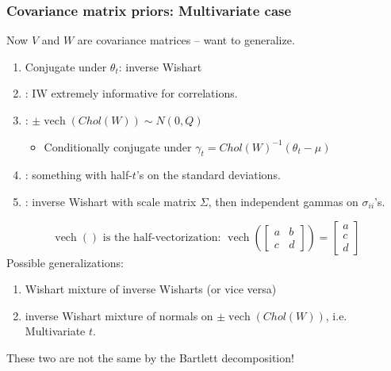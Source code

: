 \documentclass[xcolor=dvipsnames]{beamer}
\DeclareMathOperator{\vech}{vech}
\begin{document}
\begin{frame}
\frametitle{Covariance matrix priors: Multivariate case}
Now $V$ and $W$ are covariance matrices -- want to generalize.
\pause \begin{enumerate}
\item Conjugate under $\theta_t$: inverse Wishart
\item \citet{alvarez2014cov}: IW extremely informative for correlations.
\item \citet{fruhwirth2008bayesian}: $\pm\vech(Chol(W))\sim N(0,Q)$\\
\begin{itemize}
\item[] Conditionally conjugate under $\gamma_t= Chol(W)^{-1}(\theta_t - \mu)$
\end{itemize}
\item \citet{gelman2006prior}: something with half-$t$'s on the standard deviations.
\item \citet{huang2013simple}: inverse Wishart with scale matrix $\Sigma$, then independent gammas on $\sigma_{ii}$'s.
\end{enumerate}
\[
\mbox{$\vech()$ is the half-vectorization:  }\vech\left(\begin{bmatrix} a & b \\ c & d \end{bmatrix}\right) = \begin{bmatrix}a\\c\\d\end{bmatrix}
\]
\pause Possible generalizations:\\
\begin{enumerate}
\item Wishart mixture of inverse Wisharts (or vice versa)
\item inverse Wishart mixture of normals on $\pm\vech(Chol(W))$, i.e. Multivariate $t$.
\end{enumerate}
\pause These two are not the same by the Bartlett decomposition! 
\end{frame}



\end{document}
